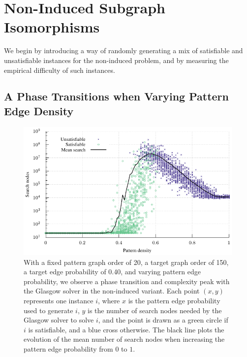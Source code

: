 \documentclass[twoside,11pt]{article}
\begin{document}
\section{Non-Induced Subgraph Isomorphisms}\label{section:non-induced}

We begin by introducing a way of randomly generating a mix of satisfiable and unsatisfiable
instances for the non-induced problem, and by measuring the empirical difficulty of such instances.

\subsection{A Phase Transitions when Varying Pattern Edge Density}

\begin{figure}[t]
    \centering
    \includegraphics*{plots/phase-transition.pdf}

    \caption{With a fixed pattern graph order of 20, a target graph order of 150, a target edge
    probability of 0.40, and varying pattern edge probability, we observe a phase transition and
    complexity peak with the Glasgow solver in the non-induced variant. Each point $(x, y)$
    represents one instance $i$, where $x$ is the pattern edge probability used to generate $i$, $y$
    is the number of search nodes needed by the Glasgow solver to solve $i$, and the point is drawn
    as a green circle if $i$ is satisfiable, and a blue cross otherwise. The black line plots the
    evolution of the mean number of search nodes when increasing the pattern edge probability from
    $0$ to $1$.}
    \label{figure:phase-transition}
\end{figure}
\end{document}
